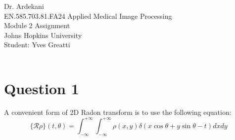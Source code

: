 \documentclass[12pt,twoside]{article}
\begin{document}
\noindent Dr. Ardekani\\
EN.585.703.81.FA24 Applied Medical Image Processing\\
Module 2 Assignment\\
Johns Hopkins University\\
Student: Yves Greatti\\\


\section*{Question 1}
 A convenient form of 2D Radon transform is to use the following equation:
 \begin{equation}
    \{ \mathcal{R} \rho \}(t, \theta) = \int_{-\infty}^{+\infty} \int_{-\infty}^{+\infty} \rho(x, y) \delta(x \cos \theta + y \sin \theta - t) dx dy
  \end{equation}
  
\end{document}
